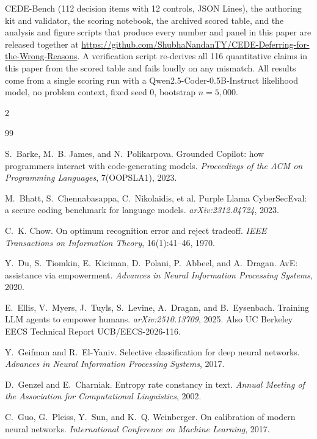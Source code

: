 \documentclass[10pt]{article}
\begin{document}
CEDE-Bench (112 decision items with 12 controls, JSON Lines), the authoring kit and validator, the
scoring notebook, the archived scored table, and the analysis and figure scripts that produce every
number and panel in this paper are released together at
\url{https://github.com/ShubhaNandanTY/CEDE-Deferring-for-the-Wrong-Reasons}. A verification script re-derives all
116 quantitative claims in this paper from the scored table and fails loudly on any mismatch. All
results come from a single scoring run with a Qwen2.5-Coder-0.5B-Instruct likelihood model, no
problem context, fixed seed 0, bootstrap $n = 5{,}000$.

\begin{multicols}{2}
\begin{thebibliography}{99}
\scriptsize
\setlength{\itemsep}{1.2pt}
\setlength{\parskip}{0pt}

S.~Barke, M.~B. James, and N.~Polikarpova.
Grounded Copilot: how programmers interact with code-generating models.
\emph{Proceedings of the ACM on Programming Languages}, 7(OOPSLA1), 2023.

M.~Bhatt, S.~Chennabasappa, C.~Nikolaidis, et al.
Purple Llama CyberSecEval: a secure coding benchmark for language models.
\emph{arXiv:2312.04724}, 2023.

C.~K. Chow.
On optimum recognition error and reject tradeoff.
\emph{IEEE Transactions on Information Theory}, 16(1):41--46, 1970.

Y.~Du, S.~Tiomkin, E.~Kiciman, D.~Polani, P.~Abbeel, and A.~Dragan.
AvE: assistance via empowerment.
\emph{Advances in Neural Information Processing Systems}, 2020.

E.~Ellis, V.~Myers, J.~Tuyls, S.~Levine, A.~Dragan, and B.~Eysenbach.
Training LLM agents to empower humans.
\emph{arXiv:2510.13709}, 2025. Also UC Berkeley EECS Technical Report UCB/EECS-2026-116.

Y.~Geifman and R.~El-Yaniv.
Selective classification for deep neural networks.
\emph{Advances in Neural Information Processing Systems}, 2017.

D.~Genzel and E.~Charniak.
Entropy rate constancy in text.
\emph{Annual Meeting of the Association for Computational Linguistics}, 2002.

C.~Guo, G.~Pleiss, Y.~Sun, and K.~Q. Weinberger.
On calibration of modern neural networks.
\emph{International Conference on Machine Learning}, 2017.


\end{thebibliography}
\end{multicols}
\end{document}
